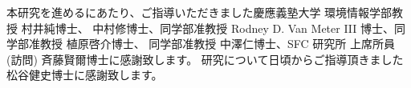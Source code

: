 \begin{acknowledgment}

本研究を進めるにあたり、ご指導いただきました慶應義塾大学 環境情報学部教授 村井純博士、
中村修博士、同学部准教授 Rodney D. Van Meter III 博士、同学部准教授 植原啓介博士、
同学部准教授 中澤仁博士、SFC 研究所 上席所員 (訪問) 斉藤賢爾博士に感謝致します。
研究について日頃からご指導頂きました松谷健史博士に感謝致します。

\end{acknowledgment}
